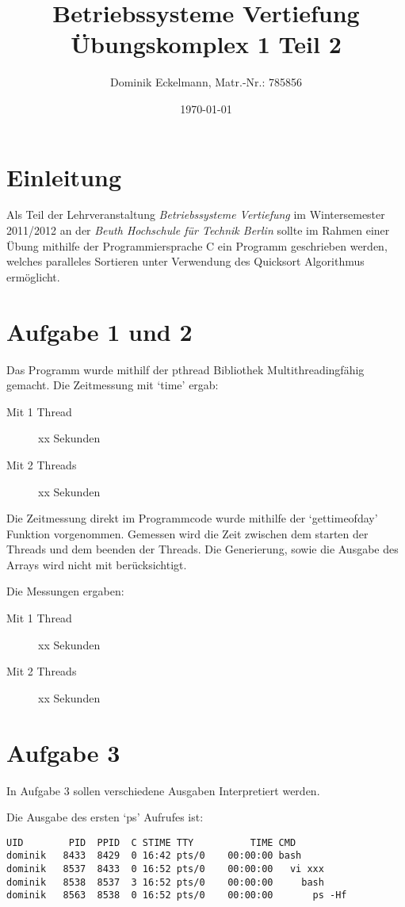 \documentclass[a4paper]{article}
\title{Betriebssysteme Vertiefung \\ Übungskomplex 1 Teil 2}
\author{Dominik Eckelmann, Matr.-Nr.: 785856}
\date{\today}
\begin{document}
\maketitle

\tableofcontents

\section{Einleitung}
Als Teil der Lehrveranstaltung \textit{Betriebssysteme Vertiefung} im Wintersemester 2011/2012 an der \textit{Beuth Hochschule für Technik Berlin} sollte im Rahmen einer Übung mithilfe der Programmiersprache C ein Programm geschrieben werden, welches paralleles Sortieren unter Verwendung
des Quicksort Algorithmus ermöglicht.

\newpage

\section{Aufgabe 1 und 2}

Das Programm wurde mithilf der pthread Bibliothek Multithreadingfähig gemacht.
Die Zeitmessung mit `time' ergab:

\begin{description}
\item[Mit 1 Thread] xx Sekunden
\item[Mit 2 Threads] xx Sekunden
\end{description}

Die Zeitmessung direkt im Programmcode wurde mithilfe der `gettimeofday' Funktion vorgenommen.
Gemessen wird die Zeit zwischen dem starten der Threads und dem beenden der Threads.
Die Generierung, sowie die Ausgabe des Arrays wird nicht mit berücksichtigt.

Die Messungen ergaben:
\begin{description}
\item[Mit 1 Thread] xx Sekunden
\item[Mit 2 Threads] xx Sekunden
\end{description}

\section{Aufgabe 3}

In Aufgabe 3 sollen verschiedene Ausgaben Interpretiert werden.

Die Ausgabe des ersten `ps' Aufrufes ist:
\begin{verbatim}
UID        PID  PPID  C STIME TTY          TIME CMD
dominik   8433  8429  0 16:42 pts/0    00:00:00 bash
dominik   8537  8433  0 16:52 pts/0    00:00:00   vi xxx
dominik   8538  8537  3 16:52 pts/0    00:00:00     bash
dominik   8563  8538  0 16:52 pts/0    00:00:00       ps -Hf
\end{verbatim}
\end{document}
